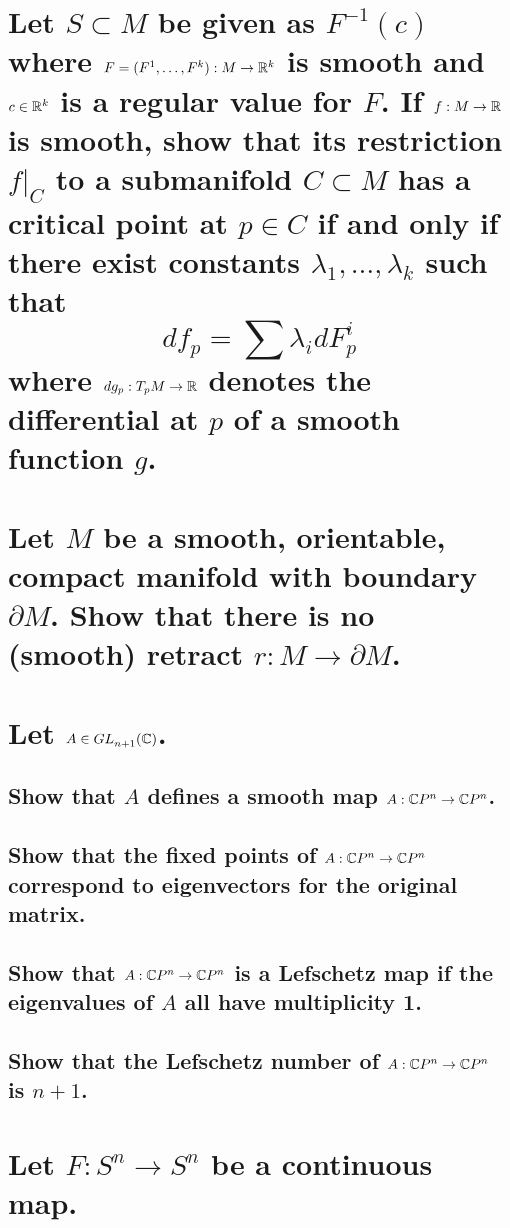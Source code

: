 \documentclass[10pt]{article}
\begin{document}
\section{Let $S \subset M$ be given as $F^{-1} (c)$ where $F = (F^1 , \dots, F^k) : M \to
  \mathbb{R}^k$ is smooth and $c \in \mathbb{R}^k$ is a regular value for $F$. If $f: M \to
  \mathbb{R}$ is smooth, show that its restriction $f|_C$ to a submanifold $C \subset M$ has a
  critical point at $p \in C$ if and only if there exist constants $\lambda_1, \dots, \lambda_k$
  such that
  $$df_p = \sum \lambda_i dF_p^i$$
  where $dg_p : T_p M \to \mathbb{R}$ denotes the differential at $p$ of a smooth function $g$.}

\section{Let $M$ be a smooth, orientable, compact manifold with boundary $\partial M$. Show that
  there is no (smooth) retract $r: M \to \partial M$. }

\section{Let $A \in GL^{}_{n+1}(\mathbb{C})$.}

\subsection{Show that $A$ defines a smooth map $A: \mathbb{C}P^{n} \to \mathbb{C}P^{n}$.}

\subsection{Show that the fixed points of $A: \mathbb{C}P^{n} \to \mathbb{C}P^{n}$ correspond to eigenvectors for the
  original matrix.}

\subsection{Show that $A : \mathbb{C}P^{n} \to \mathbb{C}P^{n}$ is a Lefschetz map if the eigenvalues of $A$ all have
  multiplicity 1.}

\subsection{Show that the Lefschetz number of $A: \mathbb{C}P^{n} \to \mathbb{C}P^{n}$ is $n+1$. }

\section{Let $F: S^n \to S^n$ be a continuous map.}
\end{document}
